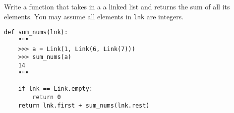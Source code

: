 \question
Write a function that takes in a a linked list and returns the sum of all
its elements. You may assume all elements in \texttt{lnk} are integers.

\begin{lstlisting}
def sum_nums(lnk):
    """
    >>> a = Link(1, Link(6, Link(7)))
    >>> sum_nums(a)
    14
    """
\end{lstlisting}

\begin{solution}[2.0in]
\begin{lstlisting}
    if lnk == Link.empty:
        return 0
    return lnk.first + sum_nums(lnk.rest)
\end{lstlisting}
\end{solution}
